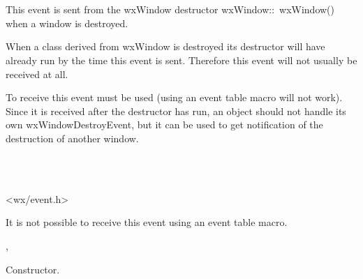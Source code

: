 \section{}\label{wxwindowdestroyevent}



This event is sent from the wxWindow destructor wxWindow::~wxWindow() when a
window is destroyed.

When a class derived from wxWindow is destroyed its destructor will have
already run by the time this event is sent. Therefore this event will not
usually be received at all.

To receive this event 
must be used (using an event table macro will not work). Since it is
received after the destructor has run, an object should not handle its
own wxWindowDestroyEvent, but it can be used to get notification of the
destruction of another window.


\\
\\


<wx/event.h>


%

It is not possible to receive this event using an event table macro.


,\rtfsp
{}


\label{wxwindowdestroyeventctor}


Constructor.

